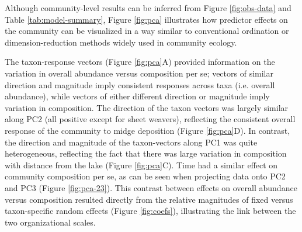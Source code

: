 Although community-level results can be inferred from Figure \ref{fig:obs-data} and
Table \ref{tab:model-summary}, Figure \ref{fig:pca} illustrates how predictor effects
on the community can be visualized in a way similar to conventional ordination or
dimension-reduction methods widely used in community ecology.

The taxon-response vectors (Figure \ref{fig:pca}A)
provided information on the variation in overall abundance versus composition per se;
vectors of similar direction and magnitude
imply consistent responses across taxa (i.e. overall abundance),
while vectors of either different direction or magnitude imply variation in composition.
The direction of the taxon vectors was largely similar along PC2 (all positive
except for sheet weavers), reflecting the consistent overall
response of the community to midge deposition (Figure \ref{fig:pca}D).
In contrast, the direction and magnitude
of the taxon-vectors along PC1 was quite heterogeneous,
reflecting the fact that there was large variation in composition with
distance from the lake (Figure \ref{fig:pca}C).
Time had a similar effect on community composition per se, as can be seen when
projecting data onto PC2 and PC3 (Figure \ref{fig:pca-23}).
This contrast between effects on overall abundance versus composition
resulted directly from the relative magnitudes
of fixed versus taxon-specific random effects (Figure \ref{fig:coefs}),
illustrating the link between the two organizational scales.
